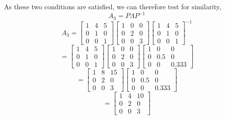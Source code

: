 \documentclass[a4paper]{article}
\begin{document}
\begin{qalist}
			As these two conditions are satisfied, we can therefore test for similarity, 
			\begin{equation}\label{q5SimilarityEqn}
				{A}_{3} = P\Lambda{P}^{-1}
			\end{equation}
			\begin{equation}\label{q5SimilarityTestSt}
				{A}_{3} = 	\begin{bmatrix}1 & 4 & 5 \\0 & 1 & 0 \\0 & 0 & 1\end{bmatrix}\begin{bmatrix}1 & 0 & 0 \\ 0 & 2 & 0 \\ 0 & 0 & 3\end{bmatrix}{\begin{bmatrix}1 & 4 & 5 \\0 & 1 & 0 \\0 & 0 & 1\end{bmatrix}}^{-1}
			\end{equation}			
			\begin{equation}\label{q5SimilarityTest2}
				 = 	\begin{bmatrix}1 & 4 & 5 \\0 & 1 & 0 \\0 & 0 & 1\end{bmatrix}\begin{bmatrix}1 & 0 & 0 \\ 0 & 2 & 0 \\ 0 & 0 & 3\end{bmatrix}\begin{bmatrix}1 & 0 & 0 \\0 & 0.5 & 0 \\0 & 0 & 0.333\end{bmatrix}
			\end{equation}
			\begin{equation}\label{q5SimilarityTest3}
				 = 	\begin{bmatrix}1 & 8 & 15 \\0 & 2 & 0 \\0 & 0 & 3\end{bmatrix}\begin{bmatrix}1 & 0 & 0 \\0 & 0.5 & 0 \\0 & 0 & 0.333\end{bmatrix}
			\end{equation}
			\begin{equation}\label{q5SimilaityTestFin}
				= \begin{bmatrix}1 & 4 & 10 \\ 0 & 2 & 0 \\ 0 & 0 & 3\end{bmatrix}
			\end{equation}
			

\end{qalist}
\end{document}

